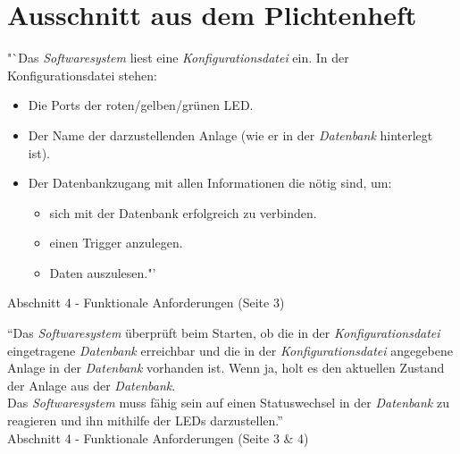 \documentclass[ignorenonframetext, 11pt, table]{beamer}
\begin{document}
	
	\section{Ausschnitt aus dem Plichtenheft}
	\begin{frame} \pause
		"`Das \emph{Softwaresystem} liest eine \emph{Konfigurationsdatei} ein. In der Konfigurationsdatei stehen: \pause
		\begin{itemize}
			\setlength\itemsep{0.2em}
			\item Die Ports der roten/gelben/grünen LED.
			\item Der Name der darzustellenden Anlage (wie er in der \emph{Datenbank} hinterlegt ist).
			\item Der Datenbankzugang mit allen Informationen die nötig sind, um:\pause
			\begin{itemize}
				\setlength\itemsep{0.2em}
				\item sich mit der Datenbank erfolgreich zu verbinden.
				\item einen Trigger anzulegen.
				\item Daten auszulesen."'\\
			\end{itemize}
		\end{itemize}
		
		{\footnotesize Abschnitt 4 - Funktionale Anforderungen (Seite 3)}
	\end{frame}
	
	\begin{frame}
		"`Das \emph{Softwaresystem} überprüft beim Starten, ob die in der \emph{Konfigurationsdatei} eingetragene \emph{Datenbank} erreichbar und die in der \emph{Konfigurationsdatei} angegebene Anlage in der \emph{Datenbank} vorhanden ist. Wenn ja, holt es den aktuellen Zustand der Anlage aus der \emph{Datenbank}.\\ \pause
		Das \emph{Softwaresystem} muss fähig sein auf einen Statuswechsel in der \emph{Datenbank} zu reagieren und ihn mithilfe der LEDs darzustellen."'\\
		{\footnotesize Abschnitt 4 - Funktionale Anforderungen (Seite 3 \& 4)}
	\end{frame}
	
\end{document}

